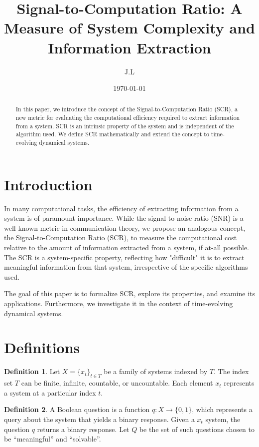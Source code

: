 \documentclass[11pt,a4paper]{article}
\title{Signal-to-Computation Ratio: A Measure of System Complexity and Information Extraction}
\author{J.L}
\date{\today}
\theoremstyle{definition}
\newtheorem{defn}{Definition}[section]
\theoremstyle{remark}
\numberwithin{equation}{section}
\begin{document}
\maketitle

\begin{abstract}
In this paper, we introduce the concept of the Signal-to-Computation Ratio (SCR), a new metric for evaluating the computational efficiency required to extract information from a system. SCR is an intrinsic property of the system and is independent of the algorithm used. We define SCR mathematically and extend the concept to time-evolving dynamical systems.
\end{abstract}

\section{Introduction}
In many computational tasks, the efficiency of extracting information from a system is of paramount importance. 
While the signal-to-noise ratio (SNR) is a well-known metric in communication theory, we propose an analogous concept, the Signal-to-Computation Ratio (SCR), to measure the computational cost relative to the amount of information extracted from a system, if at-all possible. 
The SCR is a system-specific property, reflecting how "difficult" it is to extract meaningful information from that system, irrespective of the specific algorithms used.

The goal of this paper is to formalize SCR, explore its properties, and examine its applications.
Furthermore, we investigate it  in the context of time-evolving dynamical systems. 



\section{Definitions}

\begin{defn}
Let \( X = \{x_t\}_{t \in T} \) be a family of systems indexed by \( T \).
The index set \( T \) can be finite, infinite, countable, or uncountable.
Each element \( x_t \) represents a system at a particular index \( t \).
\end{defn}

\begin{defn}
A Boolean question is a function \( q: X \rightarrow \{0, 1\} \), which represents a query about the system that yields a binary response.
Given a  \( x_t \) system, the question \( q \) returns a binary response.
Let $Q$ be the set of such questions chosen to be ``meaningful'' and ``solvable''. 
\end{defn}
\end{document}
